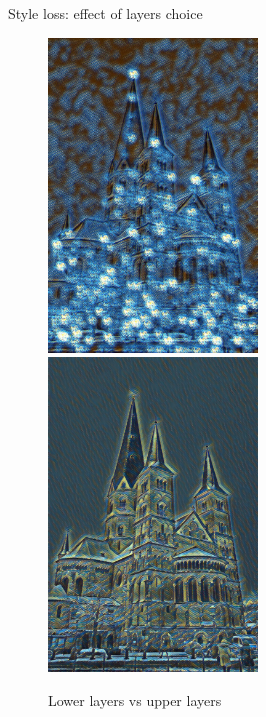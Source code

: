 \documentclass{beamer}
\begin{document}
    \begin{frame}{Style loss: effect of layers choice}

        \begin{figure}
            \includegraphics[width=0.495\textwidth, height=0.7\textheight]{bonn_muenster_starry_style_lower}
            \hfill
            \includegraphics[width=0.495\textwidth, height=0.7\textheight]{bonn_muenster_starry_style_upper}
            \caption{\label{fig:clutter}Lower layers vs upper layers}
        \end{figure}

    \end{frame}
\end{document}
